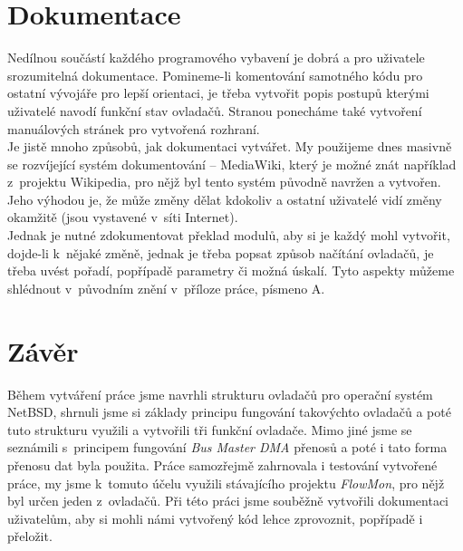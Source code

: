 \documentclass[final,11pt]{fithesis}
\begin{document}
\chapter{Dokumentace}
  Nedílnou součástí každého programového vybavení je dobrá a pro uživatele
  srozumitelná dokumentace. Pomineme-li komentování samotného kódu pro ostatní
  vývojáře pro lepší orientaci, je třeba vytvořit popis postupů kterými
  uživatelé navodí funkční stav ovladačů. Stranou ponecháme také vytvoření
  manuálových stránek pro vytvořená rozhraní. \\ \indent
  Je jistě mnoho způsobů, jak dokumentaci vytvářet. My použijeme dnes masivně
  se rozvíjející systém dokumentování -- MediaWiki, který je možné znát
  například z~projektu Wikipedia, pro nějž byl tento systém původně navržen a
  vytvořen. Jeho výhodou je, že může změny dělat kdokoliv a ostatní uživatelé
  vidí změny okamžitě (jsou vystavené v~síti Internet). \\ \indent
  Jednak je nutné zdokumentovat překlad modulů, aby si je každý mohl vytvořit,
  dojde-li k~nějaké změně, jednak je třeba popsat způsob načítání ovladačů, je
  třeba uvést pořadí, popřípadě parametry či možná úskalí. Tyto
  aspekty můžeme shlédnout v~původním znění v~příloze práce, písmeno A.

\chapter{Závěr}
  Během vytváření práce jsme navrhli strukturu ovladačů pro operační systém
  NetBSD, shrnuli jsme si základy principu fungování takovýchto ovladačů a
  poté tuto strukturu využili a vytvořili tři funkční
  ovladače. Mimo jiné jsme se seznámili s~principem fungování \emph{Bus Master
  DMA} přenosů a poté i tato forma přenosu dat byla použita. Práce
  samozřejmě zahrnovala i testování vytvořené práce, my jsme k~tomuto účelu
  využili stávajícího projektu \emph{FlowMon}, pro nějž byl určen jeden
  z~ovladačů. Při této práci jsme souběžně vytvořili
  dokumentaci uživatelům, aby si mohli námi vytvořený kód lehce zprovoznit,
  popřípadě i přeložit.

 
 


\end{document}
